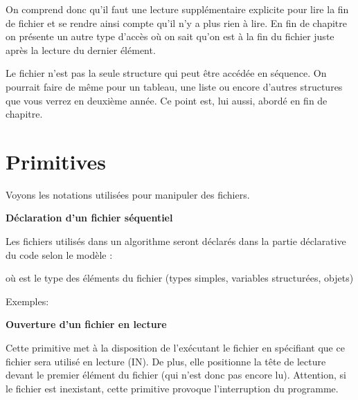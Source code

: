 On comprend donc qu'il faut une lecture supplémentaire
explicite pour lire la fin de fichier et se rendre ainsi compte
qu'il n'y a plus rien à lire. En fin
de chapitre on présente un autre type d'accès où on
sait qu'on est à la fin du fichier juste après la
lecture du dernier élément.

Le fichier n'est pas la seule structure qui peut être
accédée en séquence. On pourrait faire de même pour un tableau, une
liste ou encore d'autres structures que vous verrez en
deuxième année. Ce point est, lui aussi, abordé en fin de chapitre.


\section{Primitives}

Voyons les notations utilisées pour manipuler des fichiers.

{\sffamily\bfseries\upshape
Déclaration d’un fichier séquentiel}

Les fichiers utilisés dans un algorithme seront déclarés dans la partie
déclarative du code selon le modèle : 


où  est le type des éléments du fichier (types
simples, variables structurées, objets)


Exemples:


\bigskip

{\sffamily\bfseries\upshape
Ouverture d’un fichier en lecture }


Cette primitive met à la disposition de l’exécutant le fichier
 en spécifiant que ce fichier sera
utilisé en lecture (IN). De plus, elle positionne la tête de lecture
devant le premier élément du fichier (qui n’est donc pas encore lu).
Attention, si le fichier  est inexistant,
cette primitive provoque l’interruption du programme. 

